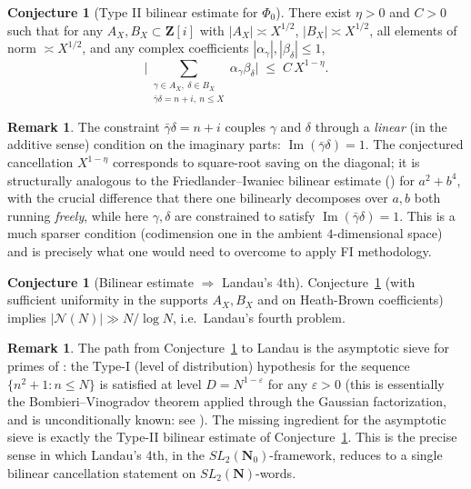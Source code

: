 \documentclass[11pt]{article}
\theoremstyle{definition}
\newtheorem{remark}[theorem]{Remark}
\newtheorem{conjecture}[theorem]{Conjecture}
\newcommand{\N}{\mathbf{N}}
\newcommand{\Nz}{\mathbf{N}_0}
\newcommand{\Z}{\mathbf{Z}}
\newcommand{\SLNz}{SL_2(\Nz)}
\newcommand{\SLN}{SL_2(\N)}
\newcommand{\im}{\operatorname{Im}}
\begin{document}
\begin{conjecture}[Type II bilinear estimate for $\Phi_0$]\label{conj:bilinear}
There exist $\eta > 0$ and $C > 0$ such that for any $A_X, B_X \subset \Z[i]$ with
$|A_X| \asymp X^{1/2}$, $|B_X| \asymp X^{1/2}$, all elements of norm $\asymp X^{1/2}$,
and any complex coefficients $|\alpha_\gamma|, |\beta_\delta| \le 1$,
\[
  \biggl|
    \sum_{\substack{\gamma\in A_X,\ \delta\in B_X\\ \bar\gamma\delta = n+i,\ n\le X}}
        \alpha_\gamma \beta_\delta
   \biggr|
   \;\le\; C\,X^{1-\eta}.
\]
\end{conjecture}

\begin{remark}\label{rmk:why-this-conjecture}
The constraint $\bar\gamma\delta = n + i$ couples $\gamma$ and $\delta$ through a
\emph{linear} (in the additive sense) condition on the imaginary parts:
$\im(\bar\gamma\delta) = 1$. The conjectured cancellation $X^{1-\eta}$ corresponds to
square-root saving on the diagonal; it is structurally analogous to the
Friedlander--Iwaniec bilinear estimate (\cite[\S 23.7]{FI10}) for $a^2 + b^4$, with the
crucial difference that there one bilinearly decomposes over $a, b$ both running
\emph{freely}, while here $\gamma, \delta$ are constrained to satisfy
$\im(\bar\gamma\delta) = 1$. This is a much sparser condition (codimension one in the
ambient $4$-dimensional space) and is precisely what one would need to overcome to apply
FI methodology.
\end{remark}

\begin{conjecture}[Bilinear estimate $\Rightarrow$ Landau's 4th]\label{conj:bilinear-implies-landau}
Conjecture~\ref{conj:bilinear} (with sufficient uniformity in the supports $A_X, B_X$ and
on Heath-Brown coefficients) implies $|\mathcal{N}(N)| \gg N/\log N$, i.e.\ Landau's
fourth problem.
\end{conjecture}

\begin{remark}
The path from Conjecture~\ref{conj:bilinear} to Landau is the asymptotic sieve for primes
of \cite{FI98a}: the Type-I (level of distribution) hypothesis for the sequence
$\{n^2+1 : n \le N\}$ is satisfied at level $D = N^{1-\varepsilon}$ for any $\varepsilon > 0$
(this is essentially the Bombieri--Vinogradov theorem applied through the Gaussian
factorization, and is unconditionally known: see \cite[\S 23.4]{FI10}). The missing
ingredient for the asymptotic sieve is exactly the Type-II bilinear estimate of
Conjecture~\ref{conj:bilinear}. This is the precise sense in which Landau's 4th, in the
$\SLNz$-framework, reduces to a single bilinear cancellation statement on
$\SLN$-words.
\end{remark}
\end{document}
